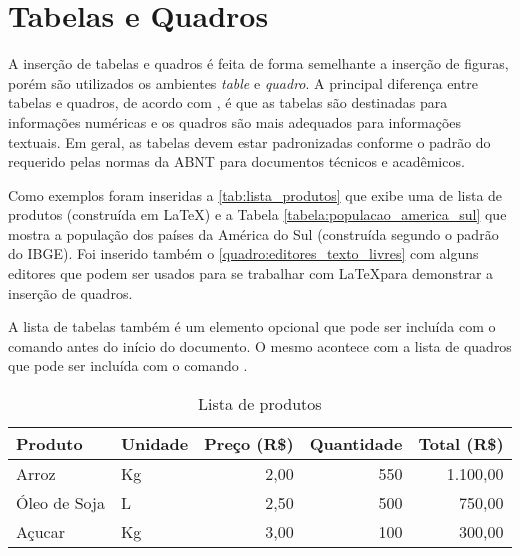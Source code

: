 \section{Tabelas e Quadros}
\label{secao:tabelas_e_quadros}

A inserção de tabelas e quadros é feita de forma semelhante a inserção de figuras, porém são utilizados os ambientes \textit{table} e \textit{quadro}. A principal diferença entre tabelas e quadros, de acordo com , é que as tabelas são destinadas para informações numéricas e os quadros são mais adequados para informações textuais. Em geral, as tabelas devem estar padronizadas conforme o padrão do  requerido pelas normas da ABNT para documentos técnicos e acadêmicos.

Como exemplos foram inseridas a \autoref{tab:lista_produtos} que exibe uma de lista de produtos (construída em \LaTeX) e a Tabela \autoref{tabela:populacao_america_sul} que mostra a população dos países da América do Sul (construída segundo o padrão do IBGE). Foi inserido também o \autoref{quadro:editores_texto_livres} com alguns editores que podem ser usados para se trabalhar com \LaTeX para demonstrar a inserção de quadros.

 A lista de tabelas também é um elemento opcional que pode ser incluída com o comando  antes do início do documento. O mesmo acontece com a lista de quadros que pode ser incluída com o comando .

\begin{table}[htb]
\centering
\caption{Lista de produtos}
\label{tab:lista_produtos}
\begin{tabularx}{\textwidth}{X|l|r|r|r} \hline
Produto      & Unidade & Preço (R\$) & Quantidade & Total (R\$) \\ \hline
Arroz        & Kg      & 2,00        & 550        & 1.100,00    \\
Óleo de Soja & L       & 2,50        & 500        & 750,00      \\
Açucar       & Kg      & 3,00        & 100        & 300,00      \\ \hline
\end{tabularx}
\fdadospesquisa
\end{table}

